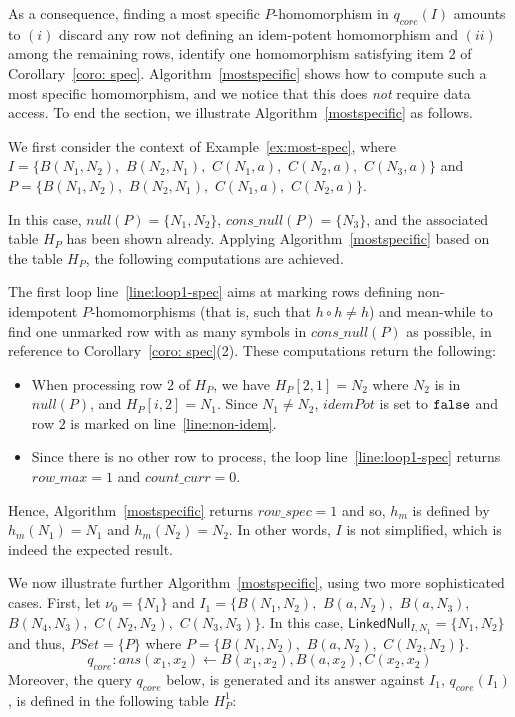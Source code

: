 As a consequence, finding a most specific $P$-homomorphism in $q_{core}(I)$ amounts to $(i)$ discard any row not defining an idem-potent homomorphism and $(ii)$ among the remaining rows, identify one homomorphism satisfying item 2 of Corollary~\ref{coro: spec}.
Algorithm~\ref{mostspecific} shows how to compute such a most specific homomorphism, and we notice that this does \emph{not} require data access.
To end the section, we illustrate Algorithm~\ref{mostspecific} as follows.

\begin{example}
    \label{ex:most-spec-DL}
    We first consider the context of Example~\ref{ex:most-spec}, where $I=\{B(N_1,N_2),$ $B(N_2,N_1),$ $C(N_1,a),$ $C(N_2,a),$ $C(N_3,a)\}$ and
    $P=\{B(N_1,N_2),$ $B(N_2,N_1),$ $C(N_1,a),$ $C(N_2,a)\}$.

    In this case, $null(P)=\{N_1, N_2\}$, $cons\_null(P)=\{N_3\}$, and the associated table $H_P$ has been shown already.
    Applying Algorithm~\ref{mostspecific} based on the table $H_P$, the following computations are achieved.

    The first loop line~\ref{line:loop1-spec} aims at marking rows defining non-idempotent $P$-homomorphisms (that is, such that $h \circ h \ne h$) and mean-while to find one unmarked row with as many symbols in $cons\_null(P)$ as possible, in reference to Corollary~\ref{coro: spec}(2).
    These computations return the following:
    \begin{itemize}
        \item When processing row $2$ of $H_P$, we have $H_P[2,1]=N_2$ where $N_2$ is in $null(P)$, and $H_P[i,2]=N_1$.
              Since $N_1 \ne N_2$, $idemPot$ is set to ${\tt false}$ and row $2$ is marked on line~\ref{line:non-idem}.

        \item Since there is no other row to process, the loop line~\ref{line:loop1-spec} returns $row\_max = 1$ and $count\_curr =0$.
    \end{itemize}
    Hence, Algorithm~\ref{mostspecific} returns $row\_spec=1$ and so, $h_m$ is defined by $h_m(N_1)=N_1$ and $h_m(N_2)=N_2$.
    In other words, $I$ is not simplified, which is indeed the expected result.

    We now illustrate further Algorithm~\ref{mostspecific}, using two more sophisticated cases.
    First, let $\nu_0=\{N_1\}$ and $I_1=\{B(N_1, N_2),$ $B(a, N_2),$ $B(a,N_3),$ $B(N_4,N_3),$ $C(N_2,N_2),$ $C(N_3,N_3)\}$.
    In this case, $\textsf{LinkedNull}_{I,N_1}=\{N_1,N_2\}$ and thus, $PSet = \{P\}$ where $P=\{B(N_1, N_2),$ $B(a,N_2),$ $C(N_2,N_2)\}$.
    \[
        q_{core}:ans(x_1,x_2) \leftarrow B(x_1, x_2), B(a,x_2),C(x_2,x_2)
    \]
    Moreover, the query $q_{core}$ below, is generated and its answer against $I_1$, $q_{core}(I_1)$, is defined in the following table $H^1_P$:


\end{example}
